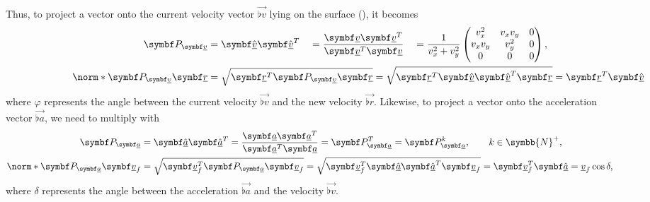Thus, to project a vector onto the current velocity vector $\vec{\flat{v}}$ lying on the surface (\greenarea), it becomes
\begin{alignat*}{4}
\projmat{\flat{v}} &= \uvec{\flat{v}} \uvec{\flat{v}}^T &&= \frac{\vec{\flat{v}} \vec{\flat{v}}^T}{\vec{\flat{v}}^T \vec{\flat{v}}} &&= \frac{1}{v_x^2 + v_y^2}
\begin{pmatrix}
v_x^2 & v_x v_y & 0\\
v_x v_y & v_y^2 & 0\\
0 & 0 & 0\\
\end{pmatrix},\\
%
\norm*{\projmat{\flat{v}} \vec{\flat{r}}} &= \mathmakebox[0pt][l]{\sqrt{\vec{\flat{r}}^T \projmat{\flat{v}} \vec{\flat{r}}} = \sqrt{\vec{\flat{r}}^T \uvec{\flat{v}} \uvec{\flat{v}}^T \vec{\flat{r}}} = \vec{\flat{r}}^T \uvec{\flat{v}} = \flat{r} \cos\varphi,}
\end{alignat*}
where $\varphi$ represents the angle between the current velocity $\vec{\flat{v}}$ and the new velocity $\vec{\flat{r}}$. Likewise, to project a vector onto the acceleration vector $\vec{\flat{a}}$, we need to multiply with
\begin{align*}
\projmat{\flat{a}} &= \uvec{\flat{a}} \uvec{\flat{a}}^T = \frac{\vec{\flat{a}} \vec{\flat{a}}^T}{\vec{\flat{a}}^T \vec{\flat{a}}} =
\projmat{\flat{a}}^T = \projmat{\flat{a}}^k, \qquad k \in \symbb{N}^+,\\
%
\norm*{\projmat{\flat{a}} \vec{\flat{v}}_f} &= \sqrt{\vec{\flat{v}}_f^T \projmat{\flat{a}} \vec{\flat{v}}_f} = \sqrt{\vec{\flat{v}}_f^T \uvec{\flat{a}} \uvec{\flat{a}}^T \vec{\flat{v}}_f} = \vec{\flat{v}}_f^T \uvec{\flat{a}} = \flat{v}_f \cos\delta,
\end{align*}
where $\delta$ represents the angle between the acceleration $\vec{\flat{a}}$ and the velocity $\vec{\flat{v}}$.
